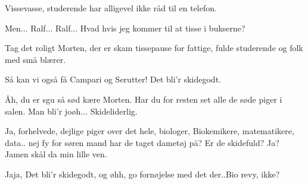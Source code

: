 \documentclass[a4paper,12pt]{article}
\begin{document}
\begin{sketch}
 Vissevasse, studerende har alligevel ikke råd til en telefon.

 Men... Ralf... Ralf... Hvad hvis jeg kommer til at tisse i bukserne? 

 Tag det roligt Morten, der er skam tissepause for fattige,
fulde studerende og folk med små blærer.

 Så kan vi også få Campari og Serutter! Det bli'r skidegodt. 

 Åh, du er sgu så sød kære Morten. Har du for resten set alle de søde piger i salen. Man bli'r joøh... Skideliderlig. 

 Ja, forhelvede, dejlige piger over det hele, biologer, Biokemikere, matematikere, data.. nej fy for søren mand har de taget dametøj på? Er de skidefuld? Ja? Jamen skål da min lille ven. 

 Jaja, Det bli'r skidegodt, og øhh, go fornøjelse med det der..Bio revy, ikke?




\end{sketch}
\end{document}

